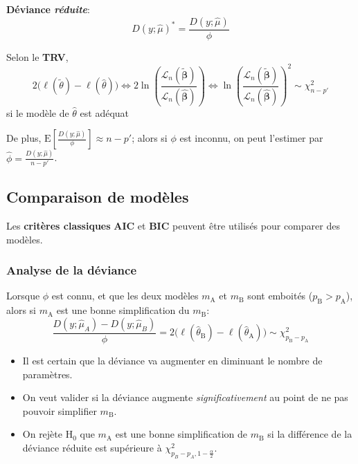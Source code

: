 \documentclass[10pt, french]{article}
\begin{document}
\begin{multicols*}{3}
\textbf{Déviance \textit{réduite}}:
	\begin{equation*}
		D(y; \hat{\mu})^{*} = \frac{D(y; \hat{\mu})}{\phi}
	\end{equation*}

Selon le \textbf{TRV}, 
\begin{equation*}
	2 	\big(\ell(\tilde{\theta}) - \ell(\hat{\theta})\big) 
\Leftrightarrow 
	2	\ln \left(\frac{\mathcal{L}_n(\bm{\tilde{\beta}})}{\mathcal{L}_n(\bm{\hat{\beta}})}\right)
\Leftrightarrow 
	\ln \left(\frac{\mathcal{L}_n(\bm{\tilde{\beta}})}{\mathcal{L}_n(\bm{\hat{\beta}})}\right	)^{2}
	\sim	\chi^{2}_{n - p'}
\end{equation*}
 si le modèle de $\hat{\theta}$ est adéquat	

De plus, $\text{E}\left[\frac{D(y; \hat{\mu})}{\phi}\right] \approx n - p'$; alors si $\phi$ est inconnu, on peut l'estimer par $\hat{\phi} = \frac{D(y ; \hat{\mu})}{n - p'}$.

\subsection*{Comparaison de modèles}

Les \textbf{critères classiques} \textbf{AIC} et \textbf{BIC} peuvent être utilisés pour comparer des modèles.

\subsubsection*{Analyse de la déviance}

\label{sssec:analyse_deviance}

Lorsque $\phi$ est connu, et que les deux modèles $m_{\text{A}}$ et $m_{\text{B}}$ sont emboités ($p_{\text{B}} > p_{\text{A}}$), alors si $m_{\text{A}}$ est une bonne simplification du $m_{\text{B}}$:
\begin{equation*}
	\frac{D(y ; \hat{\mu}_A) - D(y ; \hat{\mu}_B)}{\phi} 
		= 		2\big(\ell(\hat{\theta}_{\text{B}}) - \ell(\hat{\theta}_{\text{A}})\big)
		\sim 	\chi_{p_{\text{B}} - p_{\text{A}}}^2  
\end{equation*}

\begin{itemize}
	\item 	Il est certain que la déviance va augmenter en diminuant le nombre de paramètres. 
	\item 	On veut valider si la déviance augmente \emph{significativement} au point de ne pas pouvoir simplifier $m_{\text{B}}$. 
	\item	On rejète $\text{H}_0$ que $m_{\text{A}}$ est une bonne simplification de $m_{\text{B}}$ si la différence de la déviance réduite est supérieure à $\chi_{p_B - p_A, 1 - \frac{\alpha}{2}}^2$.
\end{itemize}


\end{multicols*}
\end{document}
